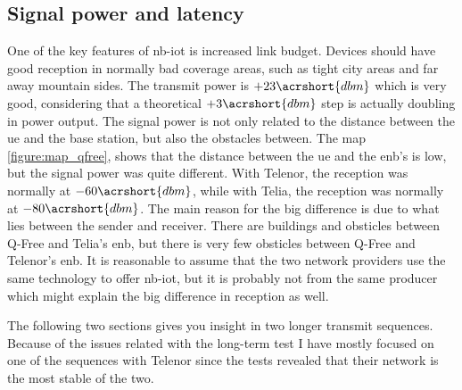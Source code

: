 \documentclass[USenglish]{ifimaster}  %
\begin{document}
\subsection{Signal power and latency}
One of the key features of \acrshort{nb-iot} is increased link budget. Devices should have good reception in normally bad coverage areas, such as tight city areas and far away mountain sides. The transmit power is ${+23 \acrshort{dbm}}$ which is very good, considering that a theoretical ${+3 \acrshort{dbm}}$ step is actually doubling in power output. The signal power is not only related to the distance between the \acrshort{ue} and the base station, but also the obstacles between. The map \vref{figure:map_qfree}, shows that the distance between the \acrshort{ue} and the \acrshort{enb}'s is low, but the signal power was quite different. With Telenor, the reception was normally at ${-60 \acrshort{dbm}}$, while with Telia, the reception was normally at ${-80 \acrshort{dbm}}$.
The main reason for the big difference is due to what lies between the sender and receiver. There are buildings and obsticles between Q-Free and Telia's \acrshort{enb}, but there is very few obsticles between Q-Free and Telenor's \acrshort{enb}. It is reasonable to assume that the two network providers use the same technology to offer \acrshort{nb-iot}, but it is probably not from the same producer which might explain the big difference in reception as well.

The following two sections gives you insight in two longer transmit sequences. Because of the issues related with the long-term test I have mostly focused on one of the sequences with Telenor since the tests revealed that their network is the most stable of the two.
\end{document}
